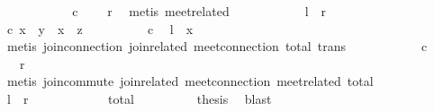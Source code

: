 \begin{isabellebody}
\ \ \ \ \ \ \ \ \isamarkupfalse%
\ \isamarkupfalse%
\ c\ \isamarkupfalse%
\ {\isachardoublequoteopen}{\isachardot}{\isachardot}{\isachardot}\ {\isacharequal}\ {\isacharquery}r{\isachardoublequoteclose}\ \isamarkupfalse%
\ {\isacharparenleft}metis\ meet{\isacharunderscore}related{}{\isacharparenright}\isanewline
\ \ \ \ \ \ \ \ \isamarkupfalse%
\ \isamarkupfalse%
\ {\isachardoublequoteopen}{\isacharquery}l\ {\isacharequal}\ {\isacharquery}r{\isachardoublequoteclose}\ \isacommand{{\isachardot}}\isamarkupfalse%
\ \isacommand{{\isacharbraceright}}\isamarkupfalse%
\isanewline
\ \ \ \ \ \ \isamarkupfalse%
\isanewline
\ \ \ \ \ \ \isacommand{{\isacharbraceleft}}\isamarkupfalse%
\ \isamarkupfalse%
\ c{\isacharcolon}\ {\isachardoublequoteopen}x\ {\isasymsqsubseteq}\ y\ {\isasymor}\ x\ {\isasymsqsubseteq}\ z{\isachardoublequoteclose}\isanewline
\ \ \ \ \ \ \ \ \isamarkupfalse%
\ c\ \isamarkupfalse%
\ {\isachardoublequoteopen}{\isacharquery}l\ {\isacharequal}\ x{\isachardoublequoteclose}\isanewline
\ \ \ \ \ \ \ \ \ \ \isamarkupfalse%
\ {\isacharparenleft}metis\ join{\isacharunderscore}connection{}\ join{\isacharunderscore}related{}\ meet{\isacharunderscore}connection\ total\ trans{\isacharparenright}\isanewline
\ \ \ \ \ \ \ \ \isamarkupfalse%
\ \isamarkupfalse%
\ c\ \isamarkupfalse%
\ {\isachardoublequoteopen}{\isachardot}{\isachardot}{\isachardot}\ {\isacharequal}\ {\isacharquery}r{\isachardoublequoteclose}\isanewline
\ \ \ \ \ \ \ \ \ \ \isamarkupfalse%
\ {\isacharparenleft}metis\ join{\isacharunderscore}commute\ join{\isacharunderscore}related{}\ meet{\isacharunderscore}connection\ meet{\isacharunderscore}related{}\ total{\isacharparenright}\isanewline
\ \ \ \ \ \ \ \ \isamarkupfalse%
\ \isamarkupfalse%
\ {\isachardoublequoteopen}{\isacharquery}l\ {\isacharequal}\ {\isacharquery}r{\isachardoublequoteclose}\ \isacommand{{\isachardot}}\isamarkupfalse%
\ \isacommand{{\isacharbraceright}}\isamarkupfalse%
\isanewline
\ \ \ \ \ \ \isamarkupfalse%
\ \isamarkupfalse%
\ total\isanewline
\ \ \ \ \ \ \isamarkupfalse%
\ \isamarkupfalse%
\ {\isacharquery}thesis\ \isamarkupfalse%
\ blast\isanewline
\ \ \ \ \isamarkupfalse%

\end{isabellebody}
